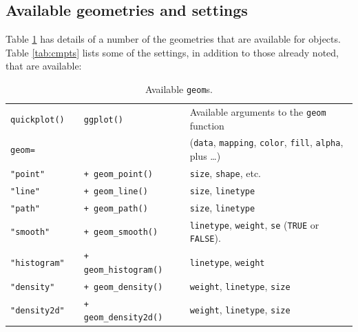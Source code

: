 \subsection*{Available geometries and settings}

Table \ref{tab:geom} has details of a number of the geometries that
are available for  objects. Table \ref{tab:cmpts} lists
some of the settings, in addition to those already noted, that are
available:\\[-9pt]
\begin{fullwidth}
\begin{table}
\caption{Available \texttt{geom}s.\label{tab:geom}}
\begin{center}
\vspace*{18pt}

\begin{minipage}[t]{0.975\textwidth}
\setcounter{mpfootnote}{\value{footnote}}
\renewcommand{\thempfootnote}{\arabic{mpfootnote}}
\hspace*{6pt} \begin{tabular}{lllll}
  \texttt{quickplot()} && \texttt{ggplot()} && Available arguments to
  the \texttt{geom} function\\
\cline{1-1} \cline{3-3} \cline{5-5}
\texttt{geom=} &&  && (\texttt{data}, \texttt{mapping},
\texttt{color}, \texttt{fill}, \texttt{alpha}, plus \ldots)\\
\cline{1-1} \cline{3-3} \cline{5-5}
  \texttt{"point"} &&\verb!+ geom_point()! && \texttt{size},
  \texttt{shape}, etc.\\
  \texttt{"line"} &&\verb!+ geom_line()! &&
  \texttt{size}, \texttt{linetype}
  \\
  \texttt{"path"} &&\verb!+ geom_path()!\footnotemark[1] &&
  \texttt{size}, \texttt{linetype}
  \\
  \texttt{"smooth"} &&\verb!+ geom_smooth()! &&
  \texttt{linetype},
  \texttt{weight}, \texttt{se} (\texttt{TRUE} or \texttt{FALSE}).
  \\
  \texttt{"histogram"} &&\verb!+ geom_histogram()! &&
  \texttt{linetype}, \texttt{weight}
  \\
  \texttt{"density"} &&\verb!+ geom_density()! &&
\texttt{weight},  \texttt{linetype}, \texttt{size}
\\
  \texttt{"density2d"} &&\verb!+ geom_density2d()! &&
\texttt{weight},  \texttt{linetype}, \texttt{size}\\
\end{tabular}
\setcounter{footnote}{\value{mpfootnote}}
\end{minipage}
\end{center}
\end{table}
\end{fullwidth}

